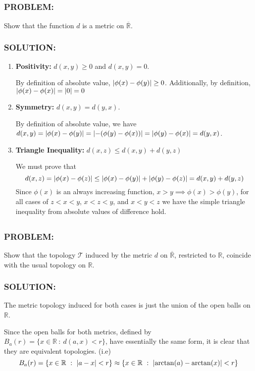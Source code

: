 \documentclass[]{article}
\newcommand{\Problem}{\subsubsection*{\textbf{PROBLEM:}}}
\newcommand{\Solution}{\subsubsection*{\textbf{SOLUTION:}}}
\newcommand{\R}{\mathbb{R}}
\newcommand{\st}{\ : \ }
\begin{document}
\subsection{}
\Problem
Show that the function $d$ is a metric on $\overline{\R}$.
\Solution
\begin{enumerate}
    \item \textbf{Positivity:} $d(x,y) \geq 0$ and $d(x,y) = 0$.
    
        By definition of absolute value, $\abs{\phi(x) - \phi(y)} \geq 0$.
        Additionally, by definition, $\abs{\phi(x) - \phi(x)} = \abs{0} = 0$

    \item \textbf{Symmetry:}  $d(x,y) = d(y,x)$.

        By definition of absolute value, we have $d(x,y) = \abs{\phi(x)  - \phi(y)} = \abs{-(\phi(y) - \phi(x))} = \abs{\phi(y) - \phi(x)} = d(y,x)$.

    \item \textbf{Triangle Inequality:} $d(x,z) \leq d(x,y) + d(y,z)$
    
        We must prove that \[
            d(x,z) = \abs{\phi(x) - \phi(z)} \leq \abs{\phi(x) - \phi(y)} + \abs{\phi(y) - \phi(z)} = d(x,y) + d(y,z)
        \]
        Since $\phi(x)$ is an always increasing function, $x > y \implies \phi(x) > \phi(y)$, for all cases of $z < x < y$, $x < z < y$, and $ x < y < z$ we have the simple triangle inequality from absolute values of difference hold.
\end{enumerate}

\subsection{}
\Problem
Show that the topology $\mathcal{T}$ induced by the metric $d$ on $\overline{\R}$, restricted to $\R$, coincide with the usual topology on $\R$.
\Solution

The metric topology induced for both cases is just the union of the open balls on $\R$.

Since the open balls for both metrics, defined by $B_a(r) = \{x \in \R \st d(a,x) < r\}$, have essentially the same form, it is clear that they are equivalent topologies.
(i.e) \[
    B_a(r) = \{x \in \R \st \abs{a - x} < r\} \approx \{x \in \R \st \abs{\arctan(a) - \arctan(x)} < r\}
\]
\end{document}
